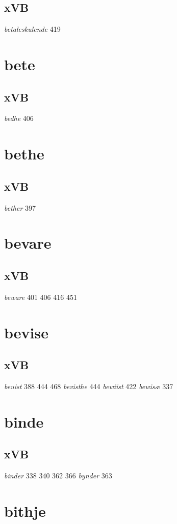 \documentclass[a4paper,twocolumn]{article}
\begin{document}
\subsection{xVB}
\label{sec:orgabcb19b}
\emph{betaleskulende} 419 
\section{bete}
\label{sec:org6c297f9}
\subsection{xVB}
\label{sec:org6a72e06}
\emph{bedhe} 406 
\section{bethe}
\label{sec:orga16b889}
\subsection{xVB}
\label{sec:orgca71323}
\emph{bether} 397 
\section{bevare}
\label{sec:orgc62eb2f}
\subsection{xVB}
\label{sec:org73c3a9e}
\emph{beware} 401 406 416 451 
\section{bevise}
\label{sec:orgc6c2042}
\subsection{xVB}
\label{sec:orgb6c5d14}
\emph{beuist} 388 444 468 \emph{bevisthe} 444 \emph{bewiist} 422 \emph{bewisæ} 337 
\section{binde}
\label{sec:orge18e899}
\subsection{xVB}
\label{sec:org8f6f5b2}
\emph{binder} 338 340 362 366 \emph{bynder} 363 
\section{bithje}
\label{sec:org3dc8563}
\end{document}
